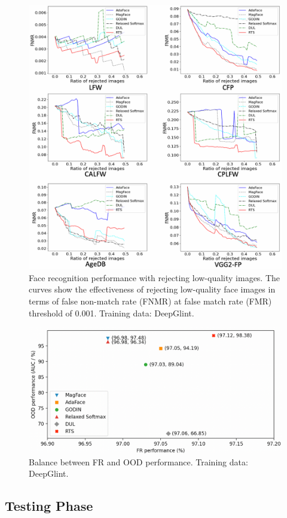 \documentclass[letterpaper]{article} %
\begin{document}
\begin{figure}[t]
    \centering
    \includegraphics[width=0.8\linewidth]{figures/rej_fr_curve_adaface_large_all_legend.png}
    \caption{Face recognition performance with rejecting low-quality images. The curves show the effectiveness of rejecting low-quality face images in terms of false non-match rate (FNMR) at false match rate (FMR) threshold of 0.001. Training data: DeepGlint.}
    \label{fig:rej_fr_curve}
\end{figure}


\begin{figure}[t]
\centering
  \includegraphics[width=0.72\linewidth]{figures/FR-OOD_small2.png}
  \caption{Balance between FR and OOD performance. Training data: DeepGlint.}
\label{fig:FR-OOD}
\end{figure}



\subsection{Testing Phase}
\label{ssec:testing phase}
\end{document}
